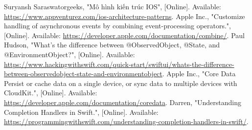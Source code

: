 \documentclass[12pt]{report}
\begin{document}
\begin{thebibliography}{1}
Suryansh Saraswatorgeeks, "Mô hình kiến trúc IOS", [Online]. Available: \url{https://www.appventurez.com/ios-architecture-patterns}.
Apple Inc., "Customize handling of asynchronous events by combining event-processing operators.", [Online]. Available: \url{https://developer.apple.com/documentation/combine/}.
 Paul Hudson, "What’s the difference between @ObservedObject, @State, and @EnvironmentObject?", [Online]. Available: \url{https://www.hackingwithswift.com/quick-start/swiftui/whats-the-difference-between-observedobject-state-and-environmentobject}.
 Apple Inc., "Core Data Persist or cache data on a single device, or sync data to multiple devices with CloudKit.", [Online]. Available: \url{https://developer.apple.com/documentation/coredata}.
 Darren, "Understanding Completion Handlers in Swift.", [Online]. Available: \url{https://programmingwithswift.com/understanding-completion-handlers-in-swift/}.
\end{thebibliography}
\end{document}
